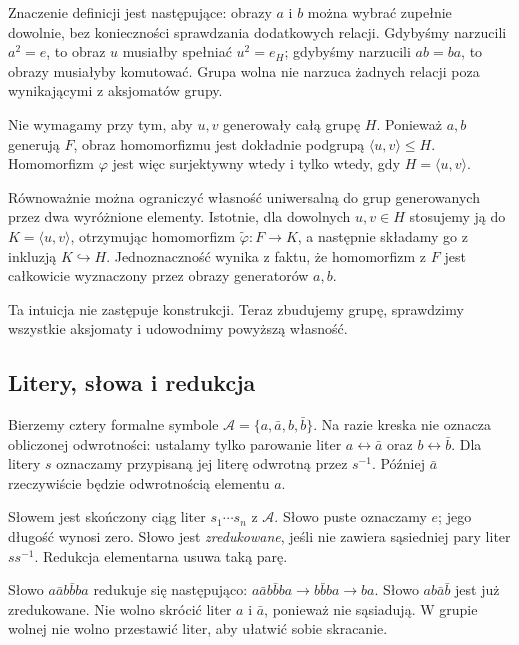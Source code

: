 Znaczenie definicji jest następujące: obrazy $a$ i $b$ można wybrać
zupełnie dowolnie, bez konieczności sprawdzania dodatkowych relacji.
Gdybyśmy narzucili $a^2=e$, to obraz $u$ musiałby spełniać $u^2=e_H$;
gdybyśmy narzucili $ab=ba$, to obrazy musiałyby komutować.
Grupa wolna nie narzuca żadnych relacji poza wynikającymi
z aksjomatów grupy.

Nie wymagamy przy tym, aby $u,v$ generowały całą grupę $H$.
Ponieważ $a,b$ generują $F$, obraz homomorfizmu jest dokładnie
podgrupą $\langle u,v\rangle\leq H$. Homomorfizm $\varphi$
jest więc surjektywny wtedy i tylko wtedy, gdy
$H=\langle u,v\rangle$.

Równoważnie można ograniczyć własność uniwersalną do grup
generowanych przez dwa wyróżnione elementy. Istotnie, dla dowolnych
$u,v\in H$ stosujemy ją do $K=\langle u,v\rangle$, otrzymując
homomorfizm $\widetilde\varphi:F\to K$, a następnie składamy go
z inkluzją $K\hookrightarrow H$. Jednoznaczność wynika z faktu,
że homomorfizm z $F$ jest całkowicie wyznaczony przez obrazy
generatorów $a,b$.

Ta intuicja nie zastępuje konstrukcji. Teraz zbudujemy grupę, sprawdzimy wszystkie aksjomaty i udowodnimy powyższą własność.

\subsection{Litery, słowa i redukcja}
Bierzemy cztery formalne symbole $\mathcal A=\{a,\bar a,b,\bar b\}$. Na razie kreska nie oznacza obliczonej odwrotności: ustalamy tylko parowanie liter $a\leftrightarrow\bar a$ oraz $b\leftrightarrow\bar b$. Dla litery $s$ oznaczamy przypisaną jej literę odwrotną przez $s^{-1}$. Później $\bar a$ rzeczywiście będzie odwrotnością elementu $a$.
\begin{definicja}
Słowem jest skończony ciąg liter $s_1\cdots s_n$ z $\mathcal A$. Słowo puste oznaczamy $e$; jego długość wynosi zero. Słowo jest \emph{zredukowane}, jeśli nie zawiera sąsiedniej pary liter $ss^{-1}$. Redukcja elementarna usuwa taką parę.
\end{definicja}
\begin{przyklad}
Słowo $a\bar a b\bar b ba$ redukuje się następująco: $a\bar a b\bar b ba\longrightarrow b\bar b ba\longrightarrow ba$. Słowo $ab\bar a\bar b$ jest już zredukowane. Nie wolno skrócić liter $a$ i $\bar a$, ponieważ nie sąsiadują. W grupie wolnej nie wolno przestawić liter, aby ułatwić sobie skracanie.
\end{przyklad}

